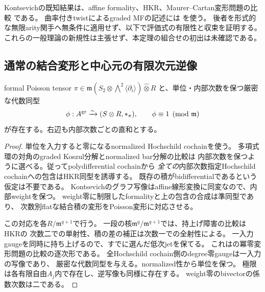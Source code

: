 Kontsevichの既知結果は、affine formality、HKR、Maurer--Cartan変形問題の比較
\cite[Theorem~4.6, Section~4.6.2, Theorem~6.3]{PKontsevich}である。
曲率付きtwistによるgraded MFの記述には
\cite[Section~2, 特にRemark~2.8とTheorem~2.12]{CT}を使う。
後者を形式的な無限arity関手へ無条件に適用せず、以下で評価式の有限性と収束を証明する。
これらの一般理論の新規性は主張せず、本定理の組合せの初出は未確認である。

\subsection{通常の結合変形と中心元の有限次元逆像}
\begin{lemma}[次数を保つunitalな星積模型]\label{cft:lem:model}
formal Poisson tensor
$\pi\in\mathfrak m(S_2\otimes\bigwedge^2\langle\partial_i\rangle)\widehat\otimes R$
と、単位・内部次数を保つ厳密な代数同型
\begin{equation}\label{cft:eq:phi}
 \phi:A^{\rm gr}\xrightarrow{\sim}(S\otimes R,*_\pi),\qquad
 \phi\equiv1\pmod{\mathfrak m}
\end{equation}
が存在する。右辺も内部次数ごとの直和とする。
\end{lemma}
\begin{proof}
単位を入力すると零になるnormalized Hochschild cochainを使う。
多項式環の対角のgraded Koszul分解とnormalized bar分解の比較は
内部次数を保つように選べる。従ってpolydifferential cochainから
\emph{全ての}内部次数指定Hochschild cochainへの包含はHKR同型を誘導する。
既存の積がbidifferentialであるという仮定は不要である。
Kontsevichのグラフ写像はaffine線形変換に同変なので、内部weightを保つ。
weight零に制限したformalityと上の包含の合成は準同型であり、
次数別flatな結合積の変形をPoisson変形に対応させる。

この対応を各$R/\mathfrak m^{q+1}$で行う。
一段の核$\mathfrak m^q/\mathfrak m^{q+1}$では、持上げ障害の比較はHKRの
次数二での単射性、積の差の補正は次数一での全射性による。
一入力gaugeを同時に持ち上げるので、すでに選んだ低次jetを保てる。
これは\cite[Theorem~4.6]{PKontsevich}の冪零変形問題の比較の逐次形である。
全Hochschild cochain側のdegree零gaugeは一入力の写像であり、
厳密な代数同型を与える。normalized性から単位を保つ。
極限は各有限自由$A_j$内で存在し、逆写像も同様に存在する。
weight零のbivectorの係数次数は二である。
\end{proof}

